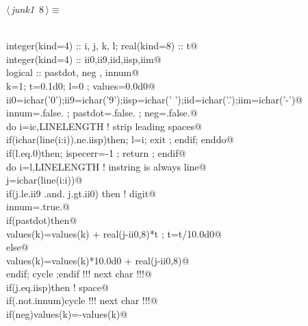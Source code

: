 \documentclass[10pt,a4paper,notitlepage]{article}
\begin{document}
\begin{flushleft} \small
\begin{minipage}{\linewidth}\label{scrap7}\raggedright\small
{} $\langle\,${\it junk1}\nobreak\ {\footnotesize {8}}$\,\rangle\equiv$
\vspace{-1ex}
\begin{list}{}{} \item
\mbox{}\verb@@\\
\mbox{}\verb@      integer(kind=4) :: i, j, k, l; real(kind=8) :: t@\\
\mbox{}\verb@      integer(kind=4) :: ii0,ii9,iid,iisp,iim@\\
\mbox{}\verb@      logical ::  pastdot, neg , innum@\\
\mbox{}\verb@      k=1; t=0.1d0; l=0 ; values=0.0d0@\\
\mbox{}\verb@      ii0=ichar('0');ii9=ichar('9');iisp=ichar(' ');iid=ichar('.');iim=ichar('-')@\\
\mbox{}\verb@      innum=.false. ; pastdot=.false. ; neg=.false.@\\
\mbox{}\verb@      do i=ic,LINELENGTH ! strip leading spaces@\\
\mbox{}\verb@        if(ichar(line(i:i)).ne.iisp)then; l=i; exit ; endif; enddo@\\
\mbox{}\verb@      if(l.eq.0)then; ispecerr=-1 ; return ; endif@\\
\mbox{}\verb@      do i=l,LINELENGTH  ! instring is always line@\\
\mbox{}\verb@        j=ichar(line(i:i))@\\
\mbox{}\verb@        if(j.le.ii9 .and. j.gt.ii0) then ! digit@\\
\mbox{}\verb@          innum=.true.@\\
\mbox{}\verb@          if(pastdot)then@\\
\mbox{}\verb@            values(k)=values(k) + real(j-ii0,8)*t ; t=t/10.0d0@\\
\mbox{}\verb@          else@\\
\mbox{}\verb@            values(k)=values(k)*10.0d0 + real(j-ii0,8)@\\
\mbox{}\verb@          endif; cycle ;endif   !!! next char !!!@\\
\mbox{}\verb@        if(j.eq.iisp)then  ! space@\\
\mbox{}\verb@          if(.not.innum)cycle   !!! next char !!!@\\
\mbox{}\verb@          if(neg)values(k)=-values(k)@\\

\end{list}
\end{minipage}
\end{flushleft}
\end{document}
